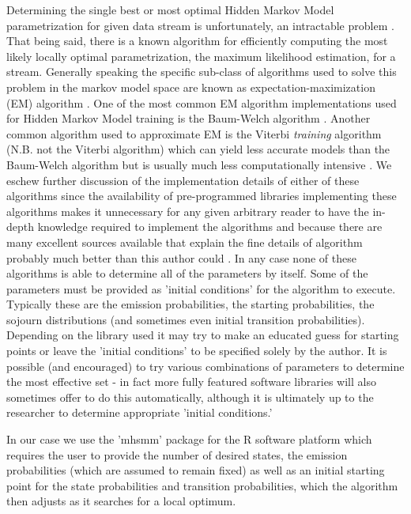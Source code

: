 \documentclass[]{article}
\begin{document}
Determining the single best or most optimal Hidden Markov Model parametrization for given data stream is unfortunately, an intractable problem \cite{Rabiner1989,Gagniuc2017,Jurafsky2017}. That being said, there is a known algorithm for efficiently computing the most likely locally optimal parametrization, the maximum likelihood estimation, for a stream. Generally speaking the specific sub-class of algorithms used to solve this problem in the markov model space are known as expectation-maximization (EM) algorithm \cite{Rabiner1989,Gagniuc2017,Jurafsky2017}. One of the most common EM algorithm implementations used for Hidden Markov Model training is the Baum-Welch algorithm \cite{Rabiner1989,Gagniuc2017,User347902016,Jurafsky2017}. Another common algorithm used to approximate EM is the Viterbi \textit{training} algorithm (N.B. not the Viterbi algorithm) which can yield less accurate models than the Baum-Welch algorithm but is usually much less computationally intensive \cite{Rodriguez2003,User347902016}. We eschew further discussion of the implementation details of either of these algorithms since the availability of pre-programmed libraries implementing these algorithms makes it unnecessary for any given arbitrary reader to have the in-depth knowledge required to implement the algorithms and because there are many excellent sources available that explain the fine details of algorithm probably much better than this author could \cite{Rabiner1989,Rodriguez2003,Gagniuc2017,Jurafsky2017}. In any case none of these algorithms is able to determine all of the parameters by itself. Some of the parameters must be provided as 'initial conditions' for the algorithm to execute. Typically these are the emission probabilities, the starting probabilities, the sojourn distributions (and sometimes even initial transition probabilities). Depending on the library used it may try to make an educated guess for starting points or leave the 'initial conditions' to be specified solely by the author. It is possible (and encouraged) to try various combinations of parameters to determine the most effective set - in fact more fully featured software libraries will also sometimes offer to do this automatically, although it is ultimately up to the researcher to determine appropriate 'initial conditions.'

In our case we use the 'mhsmm' package for the R software platform \cite{OConnell2011,OConnell2017} which requires the user to provide the number of desired states, the emission probabilities (which are assumed to remain fixed) as well as an initial starting point for the state probabilities and transition probabilities, which the algorithm then adjusts as it searches for a local optimum.
\end{document}
